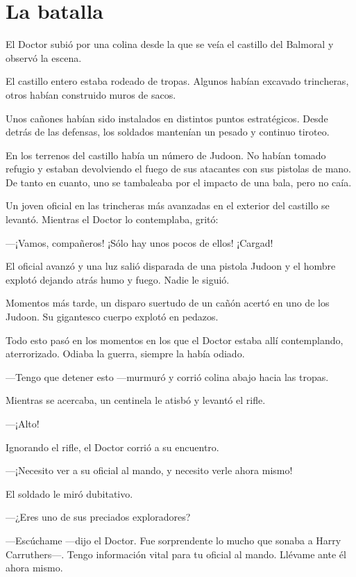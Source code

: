 \chapter*{La batalla}

El Doctor subió por una colina desde la que se veía el castillo del
Balmoral y observó la escena.

El castillo entero estaba rodeado de tropas. Algunos habían excavado
trincheras, otros habían construido muros de sacos.

Unos cañones habían sido instalados en distintos puntos estratégicos.
Desde detrás de las defensas, los soldados mantenían un pesado y
continuo tiroteo.

En los terrenos del castillo había un número de Judoon. No habían tomado
refugio y estaban devolviendo el fuego de sus atacantes con sus pistolas
de mano. De tanto en cuanto, uno se tambaleaba por el impacto de una
bala, pero no caía.

Un joven oficial en las trincheras más avanzadas en el exterior del
castillo se levantó. Mientras el Doctor lo contemplaba, gritó:

---¡Vamos, compañeros! ¡Sólo hay unos pocos de ellos! ¡Cargad!

El oficial avanzó y una luz salió disparada de una pistola Judoon y el
hombre explotó dejando atrás humo y fuego. Nadie le siguió.

Momentos más tarde, un disparo suertudo de un cañón acertó en uno de los
Judoon. Su gigantesco cuerpo explotó en pedazos.

Todo esto pasó en los momentos en los que el Doctor estaba allí
contemplando, aterrorizado. Odiaba la guerra, siempre la había odiado.

---Tengo que detener esto ---murmuró y corrió colina abajo hacia las
tropas.

Mientras se acercaba, un centinela le atisbó y levantó el rifle.

---¡Alto!

Ignorando el rifle, el Doctor corrió a su encuentro.

---¡Necesito ver a su oficial al mando, y necesito verle ahora mismo!

El soldado le miró dubitativo.

---¿Eres uno de sus preciados exploradores?

---Escúchame ---dijo el Doctor. Fue sorprendente lo mucho que sonaba a
Harry Carruthers---. Tengo información vital para tu oficial al mando.
Llévame ante él ahora mismo.

